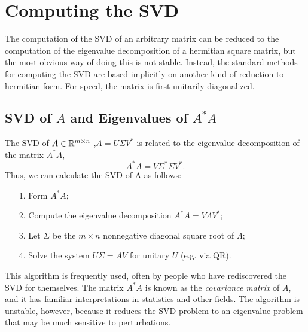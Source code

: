 \chapter{Computing the SVD} 

The computation of the SVD of an arbitrary matrix can be reduced to the computation of the eigenvalue decomposition of a hermitian square matrix, but the most obvious way of doing this is not stable. Instead, the standard methods for computing the SVD are based implicitly on another kind of reduction to hermitian form. For speed, the matrix is first unitarily diagonalized. 
 

\section{SVD of $ A $ and Eigenvalues of $ A^*A $} 
The SVD of $ A\in \mathbb{R}^{m\times n} $ ,$ A= U\Sigma V^{*} $ is related to the eigenvalue decomposition of the matrix $ A^* A $, 
\[
    A^*A = V\Sigma ^* \Sigma  V^*. 
\] 
Thus, we can calculate the SVD of A as follows: 
\begin{itemize}
    \item [1.] Form $ A^* A $; 
    \item [2.] Compute the eigenvalue decomposition $ A^* A  = V\Lambda V^*  $;
    \item [3.] Let $ \Sigma  $ be the $ m\times n $ nonnegative diagonal square root of $ \Lambda  $; 
    \item [4.] Solve the system $ U\Sigma  = AV $ for unitary $ U $ (e.g. via QR). 
\end{itemize}

This algorithm is frequently used, often by people who have rediscovered the SVD for themselves. The matrix $ A^* A $ is known as the {\it covariance matrix} of $ A $, and it has familiar interpretations in statistics and other fields. The algorithm is unstable, however, because it reduces the SVD problem to an eigenvalue problem that may be much sensitive to perturbations. 

